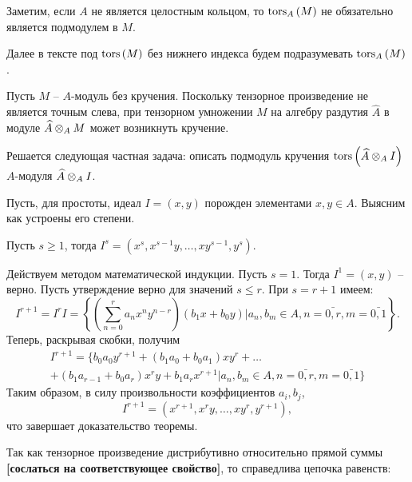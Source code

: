     Заметим, если $A$ не является целостным кольцом, то $\textup{tors}_{A}\left(M\right)$ не обязательно является подмодулем
    в $M$.

    Далее в тексте под $\textup{tors}\left(M\right)$ без нижнего индекса будем подразумевать $\textup{tors}_{A}\left(M\right)$.

    Пусть $M$ -- $A$-модуль без кручения. Поскольку тензорное произведение не является точным слева, 
    при тензорном умножении $M$ на алгебру раздутия $\widehat{A}$ в модуле $\widehat{A} \otimes_A M$ 
    может возникнуть кручение. 

    Решается следующая частная задача: описать подмодуль кручения $\textup{tors}\left(\widehat{A} \otimes_A I\right)$ 
    $A$-модуля $\widehat{A} \otimes_A I$.

    Пусть, для простоты, идеал $I = (x, y)$ порожден элементами $x, y \in A$. Выясним как устроены
    его степени. 

    \begin{Theorem}
        Пусть $s \geq 1$, тогда $I^s = (x^s, x^{s-1}y, \dots, xy^{s-1}, y^s)$.
    \end{Theorem}
    \begin{Proof}
        Действуем методом математической индукции. Пусть $s = 1$. Тогда $I^1 = (x, y)$ -- верно. Пусть утверждение
        верно для значений $s \leq r$. При $s = r + 1$ имеем:
        \begin{equation*}
            I^{r + 1} = I^{r}I = \left\{\left(\sum_{n = 0}^{r} a_nx^ny^{n - r}\right)(b_1x + b_0y) 
            \Bigg| a_n, b_m \in A, n = \bar{0, r}, m = \bar{0, 1}\right\}.
        \end{equation*}
        Теперь, раскрывая скобки, получим
        \begin{multline*}
            I^{r + 1} = \{ b_0a_0y^{r + 1} + (b_1a_0 + b_0a_1)xy^{r} + \dots \\+ 
                (b_1a_{r - 1} + b_0a_{r})x^ry + b_1a_rx^{r + 1}  | a_n, b_m \in A, n = \bar{0, r}, m = \bar{0, 1} \}
        \end{multline*}
        Таким образом, в силу произвольности коэффициентов $a_i, b_j$,
        \begin{equation*}
            I^{r + 1} = (x^{r + 1}, x^ry, \dots, xy^r, y^{r + 1}),
        \end{equation*}
        что завершает доказательство теоремы.
    \end{Proof}

    Так как тензорное произведение дистрибутивно относительно прямой суммы 
    \textbf{[сослаться на соответствующее свойство]}, то справедлива цепочка равенств:

